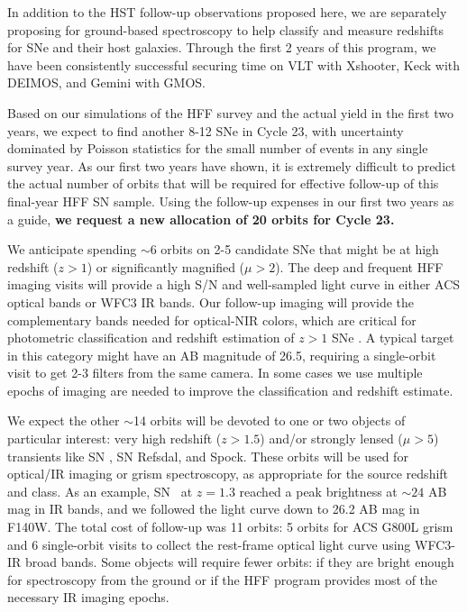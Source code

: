 \documentclass[12pt]{article}
\begin{document}
In addition to the HST follow-up observations proposed here, we are
separately proposing for ground-based spectroscopy to help classify
and measure redshifts for SNe and their host galaxies. Through the
first 2 years of this program, we have been consistently successful
securing time on VLT with Xshooter, Keck with DEIMOS, and Gemini with
GMOS.

Based on our simulations of the HFF survey and the actual yield in the
first two years, we expect to find another 8-12 SNe in Cycle 23, with
uncertainty dominated by Poisson statistics for the small number of
events in any single survey year.  As our first two years have shown,
it is extremely difficult to predict the actual number of orbits
that will be required for effective follow-up of this final-year HFF
SN sample.  Using the follow-up expenses in our first two years as a
guide, {\bf we request a new allocation of 20 orbits for Cycle 23.}

We anticipate spending $\sim$6 orbits on 2-5 candidate SNe that might
be at high redshift ($z>1$) or significantly magnified ($\mu>2$).  The
deep and frequent HFF imaging visits will provide a high S/N and
well-sampled light curve in either ACS optical bands or WFC3 IR bands.
Our follow-up imaging will provide the complementary bands needed for
optical-NIR colors, which are critical for photometric classification
and redshift estimation of $z>1$ SNe \citep{Riess:2004a,Rodney:2012}.
A typical target in this category might have an AB magnitude of 26.5,
requiring a single-orbit visit to get 2-3 filters from the same
camera.  In some cases we use multiple epochs of imaging are needed
to improve the classification and redshift estimate.

We expect the other $\sim$14 orbits will be devoted to one or two
objects of particular interest: very high redshift ($z>1.5$) and/or
strongly lensed ($\mu>5$) transients like SN \tomas, SN Refsdal, and
Spock.  These orbits will be used for optical/IR imaging or grism
spectroscopy, as appropriate for the source redshift and class.  As an
example, SN \tomas\ at $z=1.3$ reached a peak brightness at $\sim24$
AB mag in IR bands, and we followed the light curve down to 26.2 AB
mag in F140W.  The total cost of follow-up was 11 orbits: 5 orbits for
ACS G800L grism and 6 single-orbit visits to collect the rest-frame
optical light curve using WFC3-IR broad bands.  Some objects will
require fewer orbits: if they are bright enough for spectroscopy from
the ground or if the HFF program provides most of the necessary IR
imaging epochs.
\end{document}
